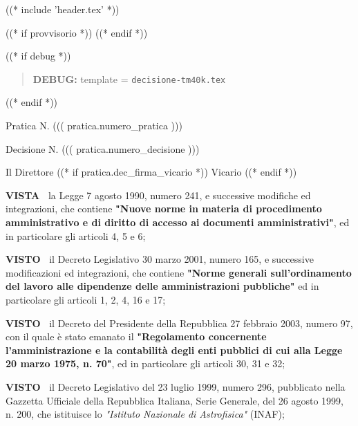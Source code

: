 
((* include 'header.tex' *))

((* if provvisorio *))
((* endif *))


\topaddr

((* if debug *))
\begin{quotation}
	\textbf{DEBUG:} template = \texttt{decisione-tm40k.tex}
\end{quotation}
((* endif *))

Pratica N. ((( pratica.numero_pratica )))

\begin{flushright}
Decisione N. ((( pratica.numero_decisione )))
\end{flushright}

\begin{center}

Il Direttore ((* if pratica.dec_firma_vicario *)) Vicario ((* endif *))

\end{center}
\textbf{VISTA~}	la Legge 7 agosto 1990, numero 241, e successive modifiche
ed integrazioni, che contiene \textbf{"Nuove norme in materia di procedimento
amministrativo e di diritto di accesso ai documenti amministrativi"},
ed in particolare gli articoli 4, 5 e 6;

\textbf{VISTO~}	il Decreto Legislativo 30 marzo 2001, numero 165, e
successive modificazioni ed integrazioni, che contiene \textbf{"Norme generali
sull’ordinamento del lavoro alle dipendenze delle amministrazioni
pubbliche"} ed in particolare gli articoli 1, 2, 4, 16 e 17;

\textbf{VISTO~}	il Decreto del Presidente della Repubblica 27 febbraio
2003, numero 97, con il quale è stato emanato il \textbf{"Regolamento concernente
l’amministrazione e la contabilità degli enti pubblici di cui alla
Legge 20 marzo 1975, n. 70"}, ed in particolare gli articoli 30, 31 e 32;

\textbf{VISTO~}	il Decreto Legislativo del 23 luglio 1999, numero 296,
pubblicato nella Gazzetta Ufficiale della Repubblica Italiana, Serie
Generale, del 26 agosto 1999, n. 200, che istituisce lo \textit{"Istituto
Nazionale di Astrofisica"} (INAF);

